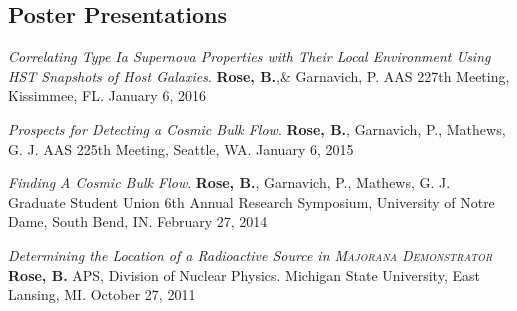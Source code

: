 \documentclass[margin]{res}
\begin{document}
\begin{resume}
\section{Poster Presentations}

{\sl Correlating Type Ia Supernova Properties with Their Local Environment Using HST Snapshots of Host Galaxies}. {\bf Rose, B.},\& Garnavich, P. AAS 227th Meeting, Kissimmee, FL. January 6, 2016

{\sl Prospects for Detecting a Cosmic Bulk Flow}. {\bf Rose, B.}, Garnavich, P., Mathews, G. J. AAS 225th Meeting, Seattle, WA. January 6, 2015

{\sl Finding A Cosmic Bulk Flow}. {\bf Rose, B.}, Garnavich, P., Mathews, G. J. Graduate Student Union 6th Annual Research Symposium, University of Notre Dame, South Bend, IN. February 27, 2014

{\sl Determining the Location of a Radioactive Source in \textsc{Majorana Demonstrator}} {\bf Rose, B.} APS, Division of Nuclear Physics. Michigan State University, East Lansing, MI. October 27, 2011







\end{resume}
\end{document}
